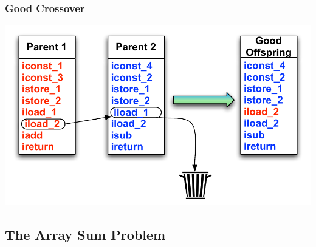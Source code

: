 \documentclass{beamer}
\begin{document}
\begin{frame}
  \frametitle{Good Crossover}
  \includegraphics[height=.5\textheight]{Illustrations/goodCrossover.pdf}
\end{frame}



\subsection[The Array Sum Problem]{The Array Sum Problem}
\end{document}
